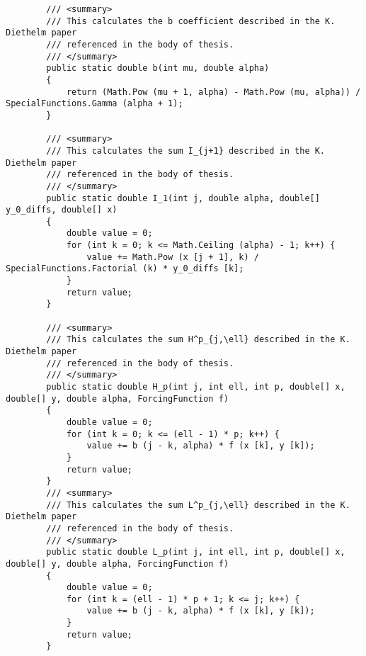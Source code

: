 \begin{lstlisting}
		/// <summary>
		/// This calculates the b coefficient described in the K. Diethelm paper
		/// referenced in the body of thesis.
		/// </summary>
		public static double b(int mu, double alpha)
		{
			return (Math.Pow (mu + 1, alpha) - Math.Pow (mu, alpha)) / SpecialFunctions.Gamma (alpha + 1);
		}

		/// <summary>
		/// This calculates the sum I_{j+1} described in the K. Diethelm paper
		/// referenced in the body of thesis.
		/// </summary>
		public static double I_1(int j, double alpha, double[] y_0_diffs, double[] x)
		{
			double value = 0;
			for (int k = 0; k <= Math.Ceiling (alpha) - 1; k++) {
				value += Math.Pow (x [j + 1], k) / SpecialFunctions.Factorial (k) * y_0_diffs [k];
			}
			return value;
		}

		/// <summary>
		/// This calculates the sum H^p_{j,\ell} described in the K. Diethelm paper
		/// referenced in the body of thesis.
		/// </summary>
		public static double H_p(int j, int ell, int p, double[] x, double[] y, double alpha, ForcingFunction f)
		{
			double value = 0;
			for (int k = 0; k <= (ell - 1) * p; k++) {
				value += b (j - k, alpha) * f (x [k], y [k]);
			}
			return value;
		}
		/// <summary>
		/// This calculates the sum L^p_{j,\ell} described in the K. Diethelm paper
		/// referenced in the body of thesis.
		/// </summary>
		public static double L_p(int j, int ell, int p, double[] x, double[] y, double alpha, ForcingFunction f) 
		{
			double value = 0;
			for (int k = (ell - 1) * p + 1; k <= j; k++) {
				value += b (j - k, alpha) * f (x [k], y [k]);
			}
			return value;
		}


\end{lstlisting}
